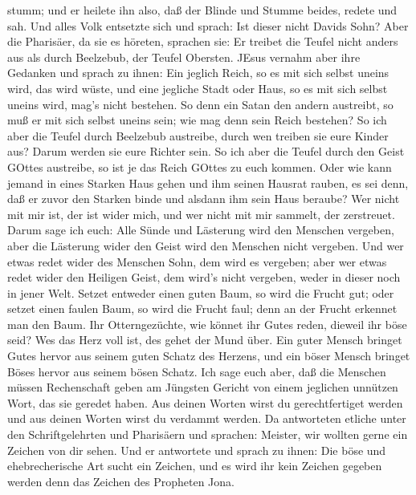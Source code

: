 stumm; und er heilete ihn also, daß der Blinde und Stumme beides, redete
und sah.  Und alles Volk entsetzte sich und sprach: Ist
dieser nicht Davids Sohn?  Aber die Pharisäer, da sie es
höreten, sprachen sie: Er treibet die Teufel nicht anders aus als durch
Beelzebub, der Teufel Obersten.  JEsus vernahm aber ihre
Gedanken und sprach zu ihnen: Ein jeglich Reich, so es mit sich selbst
uneins wird, das wird wüste, und eine jegliche Stadt oder Haus, so es
mit sich selbst uneins wird, mag's nicht bestehen.  So denn
ein Satan den andern austreibt, so muß er mit sich selbst uneins sein;
wie mag denn sein Reich bestehen?  So ich aber die Teufel
durch Beelzebub austreibe, durch wen treiben sie eure Kinder aus? Darum
werden sie eure Richter sein.  So ich aber die Teufel durch
den Geist GOttes austreibe, so ist je das Reich GOttes zu euch kommen.
 Oder wie kann jemand in eines Starken Haus gehen und ihm
seinen Hausrat rauben, es sei denn, daß er zuvor den Starken binde und
alsdann ihm sein Haus beraube?  Wer nicht mit mir ist, der
ist wider mich, und wer nicht mit mir sammelt, der zerstreuet.
 Darum sage ich euch: Alle Sünde und Lästerung wird den
Menschen vergeben, aber die Lästerung wider den Geist wird den Menschen
nicht vergeben.  Und wer etwas redet wider des Menschen
Sohn, dem wird es vergeben; aber wer etwas redet wider den Heiligen
Geist, dem wird's nicht vergeben, weder in dieser noch in jener Welt.
 Setzet entweder einen guten Baum, so wird die Frucht gut;
oder setzet einen faulen Baum, so wird die Frucht faul; denn an der
Frucht erkennet man den Baum.  Ihr Otterngezüchte, wie
könnet ihr Gutes reden, dieweil ihr böse seid? Wes das Herz voll ist,
des gehet der Mund über.  Ein guter Mensch bringet Gutes
hervor aus seinem guten Schatz des Herzens, und ein böser Mensch bringet
Böses hervor aus seinem bösen Schatz.  Ich sage euch aber,
daß die Menschen müssen Rechenschaft geben am Jüngsten Gericht von einem
jeglichen unnützen Wort, das sie geredet haben.  Aus deinen
Worten wirst du gerechtfertiget werden und aus deinen Worten wirst du
verdammt werden.  Da antworteten etliche unter den
Schriftgelehrten und Pharisäern und sprachen: Meister, wir wollten gerne
ein Zeichen von dir sehen.  Und er antwortete und sprach zu
ihnen: Die böse und ehebrecherische Art sucht ein Zeichen, und es wird
ihr kein Zeichen gegeben werden denn das Zeichen des Propheten Jona.
